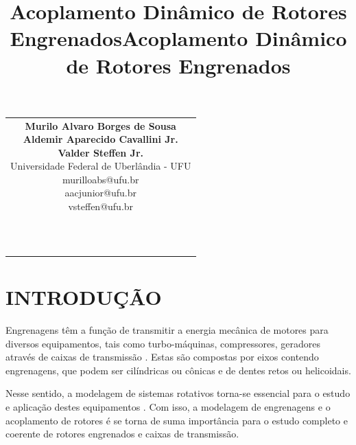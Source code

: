 \documentclass[10pt,fleqn,a4paper,twoside]{article}
\renewcommand{\authors}[1]{{\bfseries #1}}
\renewcommand{\institution}[1]{{\normalfont\small #1}}
\begin{document}
	\fphead
	
	\noindent\hspace*{-2.5mm}\begin{tabular}{||c}
		\parbox{0.97\textwidth}{
			\vspace{2mm}
			{\centering \title{Acoplamento Dinâmico de Rotores Engrenados} \par} \vspace{4mm}
			\authors{Murilo Alvaro Borges de Sousa} \\
			\authors{Aldemir Aparecido Cavallini Jr.} \\
			\authors{Valder Steffen Jr.} \\
			\institution{Universidade Federal de Uberlândia - UFU} \\
			\institution{murilloabs@ufu.br}\\
			\institution{aacjunior@ufu.br}\\
			\institution{vsteffen@ufu.br} \\
			\\
			\\
			\\
			\vspace{2mm}
		}
	\end{tabular}
	
	\section{INTRODUÇÃO}
	
	Engrenagens têm a função de transmitir a energia mecânica de motores para diversos equipamentos, tais como turbo-máquinas, compressores, geradores através de caixas de transmissão \citep{sousa2026}. Estas são compostas por eixos contendo engrenagens, que podem ser cilíndricas ou cônicas e de dentes retos ou helicoidais. 
	
	Nesse sentido, a modelagem de sistemas rotativos torna-se essencial para o estudo e aplicação destes equipamentos \citep{Friswell2010}. Com isso, a modelagem de engrenagens e o acoplamento de rotores é se torna de suma importância para o estudo completo e coerente de rotores engrenados e caixas de transmissão.
	
\end{document}
